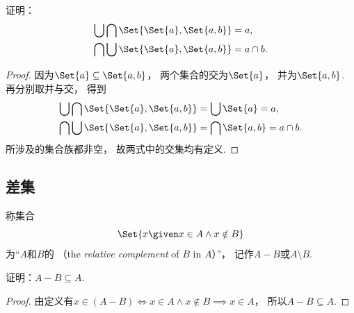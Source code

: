 \begin{example}
    证明：
    \begin{align*}
        \bigcup\bigcap\Set{\Set{a},\Set{a,b}} &= a, \\
        \bigcap\bigcup\Set{\Set{a},\Set{a,b}} &= a\cap b.
    \end{align*}
    \begin{proof}
        因为\(\Set{a}\subseteq\Set{a,b}\)，
        两个集合的交为\(\Set{a}\)，
        并为\(\Set{a,b}\).
        再分别取并与交，
        得到
        \begin{align*}
            \bigcup\bigcap\Set{\Set{a},\Set{a,b}}
            &= \bigcup\Set{a}=a, \\
            \bigcap\bigcup\Set{\Set{a},\Set{a,b}}
            &= \bigcap\Set{a,b}=a\cap b.
        \end{align*}
        所涉及的集合族都非空，
        故两式中的交集均有定义.
    \end{proof}
\end{example}

\subsection{差集}
\begin{definition}
称集合\begin{equation*}
	\Set{ x \given x \in A \land x \notin B }
\end{equation*}为“\(A\)和\(B\)的%
（the \emph{relative complement} of \(B\) in \(A\)）”，
记作\(A - B\)或\(A \setminus B\).
\end{definition}

\begin{example}
证明：\(A - B \subseteq A\).
\begin{proof}
由定义有\(
	x \in (A - B)
	\iff  %
	x \in A \land x \notin B
	\implies  %
	x \in A
\)，
所以\(A - B \subseteq A\).
\end{proof}
\end{example}


